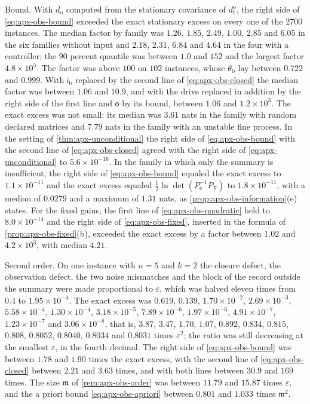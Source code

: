 \begin{numcheck}
Bound. With $\bar d_{\mathrm o}$ computed from the stationary covariance of $d^{\mathrm o}_t$, the right side of \eqref{eq:apx-obs-bound} exceeded the exact stationary excess on every one of the $2700$ instances. The median factor by family was $1.26$, $1.85$, $2.49$, $1.00$, $2.85$ and $6.05$ in the six families without input and $2.18$, $2.31$, $6.84$ and $4.64$ in the four with a controller; the $90$ percent quantile was between $1.0$ and $152$ and the largest factor $4.8\times10^5$. The factor was above $100$ on $102$ instances, whose $\theta_{\mathrm b}$ lay between $0.722$ and $0.999$. With $\mathsf i_{\mathrm b}$ replaced by the second line of \eqref{eq:apx-obs-closed} the median factor was between $1.06$ and $10.9$, and with the drive replaced in addition by the right side of the first line and $\mathsf o$ by its bound, between $1.06$ and $1.2\times10^3$. The exact excess was not small: its median was $3.61$ nats in the family with random declared matrices and $7.79$ nats in the family with an unstable fine process. In the setting of \cref{thm:apx-unconditional} the right side of \eqref{eq:apx-obs-bound} with the second line of \eqref{eq:apx-obs-closed} agreed with the right side of \eqref{eq:apx-unconditional} to $5.6\times10^{-16}$. In the family in which only the summary is insufficient, the right side of \eqref{eq:apx-obs-bound} equaled the exact excess to $1.1\times10^{-11}$ and the exact excess equaled $\frac12\ln\det(P_{\mathrm e}^{-1}P_{\mathsf T})$ to $1.8\times10^{-11}$, with a median of $0.0279$ and a maximum of $1.31$ nats, as \cref{prop:apx-obs-information}(e) states. For the fixed gains, the first line of \eqref{eq:apx-obs-quadratic} held to $8.0\times10^{-14}$ and the right side of \eqref{eq:apx-obs-fixed}, inserted in the formula of \cref{prop:apx-obs-fixed}(b), exceeded the exact excess by a factor between $1.02$ and $4.2\times10^3$, with median $4.21$.

Second order. On one instance with $n=5$ and $k=2$ the closure defect, the observation defect, the two noise mismatches and the block of the record outside the summary were made proportional to $\varepsilon$, which was halved eleven times from $0.4$ to $1.95\times10^{-4}$. The exact excess was $0.619$, $0.139$, $1.70\times10^{-2}$, $2.69\times10^{-3}$, $5.58\times10^{-4}$, $1.30\times10^{-4}$, $3.18\times10^{-5}$, $7.89\times10^{-6}$, $1.97\times10^{-6}$, $4.91\times10^{-7}$, $1.23\times10^{-7}$ and $3.06\times10^{-8}$, that is, $3.87$, $3.47$, $1.70$, $1.07$, $0.892$, $0.834$, $0.815$, $0.808$, $0.8052$, $0.8040$, $0.8034$ and $0.8031$ times $\varepsilon^2$; the ratio was still decreasing at the smallest $\varepsilon$, in the fourth decimal. The right side of \eqref{eq:apx-obs-bound} was between $1.78$ and $1.90$ times the exact excess, with the second line of \eqref{eq:apx-obs-closed} between $2.21$ and $3.63$ times, and with both lines between $30.9$ and $169$ times. The size $\mathfrak m$ of \cref{rem:apx-obs-order} was between $11.79$ and $15.87$ times $\varepsilon$, and the a priori bound \eqref{eq:apx-obs-apriori} between $0.801$ and $1.033$ times $\mathfrak m^2$.


\end{numcheck}
